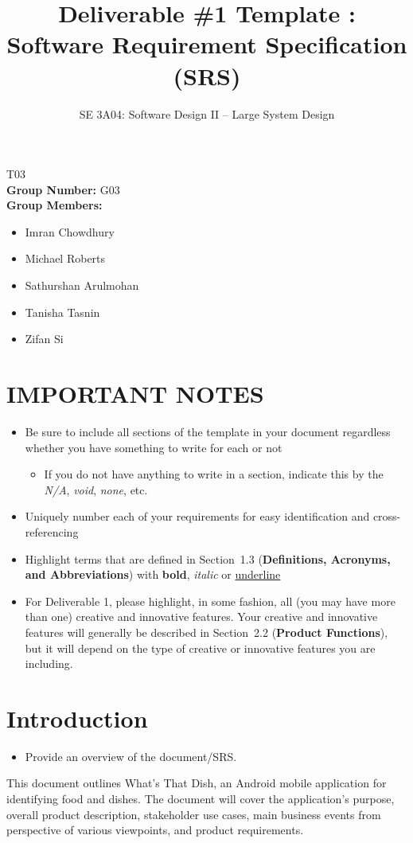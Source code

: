 \documentclass[]{article}
\title{Deliverable \#1 Template : Software Requirement Specification (SRS)}
\author{SE 3A04: Software Design II -- Large System Design}
\date{}
\begin{document}
\maketitle	
{} T03\\
{\bf Group Number:} G03 \\
{\bf Group Members:} 
\begin{itemize}
	\item Imran Chowdhury
	\item Michael Roberts
	\item Sathurshan Arulmohan
	\item Tanisha Tasnin
	\item Zifan Si
\end{itemize}

\section*{IMPORTANT NOTES}
\begin{itemize}
	\item Be sure to include all sections of the template in your document regardless whether you have something to write for each or not
	\begin{itemize}
		\item If you do not have anything to write in a section, indicate this by the \emph{N/A}, \emph{void}, \emph{none}, etc.
	\end{itemize}
	\item Uniquely number each of your requirements for easy identification and cross-referencing
	\item Highlight terms that are defined in Section~1.3 (\textbf{Definitions, Acronyms, and Abbreviations}) with \textbf{bold}, \emph{italic} or \underline{underline}
	\item For Deliverable 1, please highlight, in some fashion, all (you may have more than one) creative and innovative features. Your creative and innovative features will generally be described in Section~2.2 (\textbf{Product Functions}), but it will depend on the type of creative or innovative features you are including.
\end{itemize}

\newpage
\section{Introduction}
\label{sec:introduction}

\begin{itemize}
	\item Provide an overview of the document/SRS.
\end{itemize}
This document outlines What's That Dish, an Android mobile application for identifying food and dishes. The document will cover the application's purpose, overall product description, stakeholder use cases, main business events from perspective of various viewpoints, and product requirements.
\end{document}
